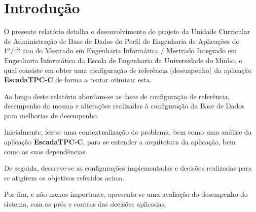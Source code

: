 \chapter{Introdução} \label{chap:intro}

\hspace{5mm} O presente relatório detalha o desenvolvimento do projeto da Unidade Curricular de Administração de Base de Dados do Perfil de Engenharia de Aplicações do 1º/4º ano do Mestrado em Engenharia Informática / Mestrado Integrado em Engenharia Informática da Escola de Engenharia da Universidade do Minho, o qual consiste em obter uma configuração de referência (desempenho) da aplicação \textbf{EscadaTPC-C} de forma a tentar otimizar esta.

\hspace{5mm} Ao longo deste relatório abordam-se as fases de configuração de referência, desempenho da mesma e alterações realizadas à configuração da Base de Dados para melhorias de desempenho.

\hspace{5mm} Inicialmente, fez-se uma contextualização do problema, bem como uma análise da aplicação \textbf{EscadaTPC-C}, para se entender a arquitetura da aplicação, bem como as suas dependências.

\hspace{5mm} De seguida, descreve-se as configurações implementadas e decisões realizadas para se atigirem os objetivos referidos acima.

\hspace{5mm} Por fim, e não menos importante, apresenta-se uma avaliação do desempenho do sistema, com os prós e contras das decisões aplicadas.